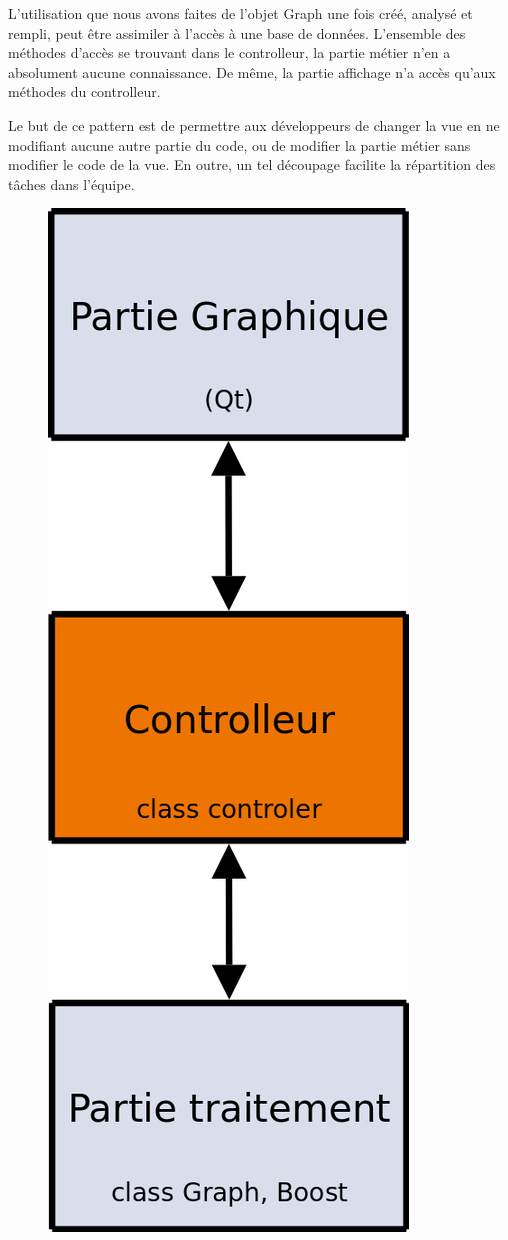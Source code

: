 L'utilisation que nous avons faites de l'objet Graph une fois créé, analysé et rempli, peut être assimiler à l'accès à une base de données. L'ensemble des méthodes d'accès se trouvant dans le controlleur, la partie métier n'en a absolument aucune connaissance. De même, la partie affichage n'a accès qu'aux méthodes du controlleur.

Le but de ce pattern est de permettre aux développeurs de changer la vue en ne modifiant aucune autre partie du code, ou de modifier la partie métier sans modifier le code de la vue. En outre, un tel découpage facilite la répartition des tâches dans l'équipe.

\begin{figure}[!ht]
\begin{center}
        \includegraphics[height=0.3\textheight]{./schema/mvcScheme.png}

\end{center}
\end{figure}
